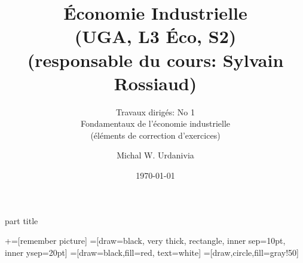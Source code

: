 
\usepackage{color}
\usepackage{tikz}

\usepackage{enumerate}   


%
  \usepackage{eso-pic}

{
    \begin{centering}
    \begin{beamercolorbox}[sep=11pt,center]{part title}
    \insertsection\par
    \end{beamercolorbox}
    \end{centering}
}
\title[]{ \textbf{Économie Industrielle} \\ (UGA, L3 Éco, S2) \\ (responsable du cours: Sylvain Rossiaud)}
\subtitle{Travaux dirigés: No 1\\ 
Fondamentaux de l'économie industrielle\\(éléments de correction d'exercices)}
\date{\today}
\author{Michal W. Urdanivia\inst{*}}




\usetikzlibrary{positioning}
\usetikzlibrary{snakes}
\usetikzlibrary{calc}
\usetikzlibrary{arrows}
\usetikzlibrary{decorations.markings}
\usetikzlibrary{shapes.misc}
\usetikzlibrary{matrix,shapes,arrows,fit,tikzmark}
\usetikzlibrary{shapes}
\newcommand\marktopleft[1]{
    \tikz[overlay,remember picture] 
        \node (marker-#1-a) at (-.3em,.3em) {};%
}
\newcommand\markbottomright[2]{%
    \tikz[overlay,remember picture] 
        \node (marker-#1-b) at (0em,0em) {};%
}
+=[remember picture] 
 =[draw=black, very thick, rectangle, inner sep=10pt, inner ysep=20pt]
 =[draw=black,fill=red, text=white]
=[draw,circle,fill=gray!50]



